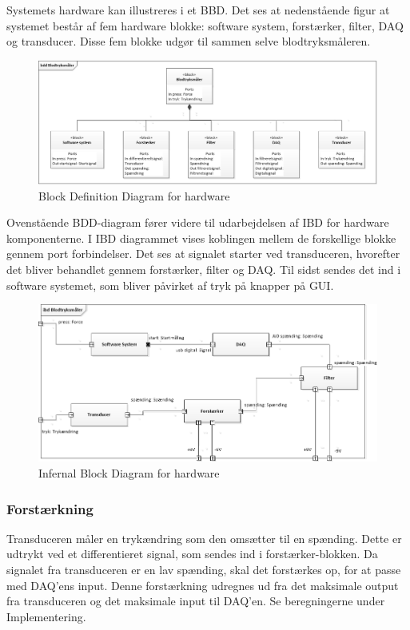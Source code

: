 Systemets hardware kan illustreres i et BBD. Det ses at nedenstående figur at systemet består af fem hardware blokke: software system, forstærker, filter, DAQ og transducer. Disse fem blokke udgør til sammen selve blodtryksmåleren.  
	
\begin{figure}[H]
	\centering
	\includegraphics[width=1.0\textwidth]{Figurer/BDD}
	\caption{Block Definition Diagram for hardware}
\end{figure}

Ovenstående BDD-diagram fører videre til udarbejdelsen af IBD for hardware komponenterne. I IBD diagrammet vises koblingen mellem de forskellige blokke gennem port forbindelser.  Det ses at signalet starter ved transduceren, hvorefter det bliver behandlet gennem forstærker, filter og DAQ. Til sidst sendes det ind i software systemet, som bliver påvirket af tryk på knapper på GUI. 

\begin{figure}[H]
	\centering
	\includegraphics[width=1.0\textwidth]{Figurer/IBD}
	\caption{Infernal Block Diagram for hardware}
	\label{fig:IBD viser koblingen mellem blodtrykssystemets hardwaredele}
\end{figure}

\subsubsection{Forstærkning}
Transduceren måler en trykændring som den omsætter til en spænding. Dette er udtrykt ved et differentieret signal, som sendes ind i forstærker-blokken. Da signalet fra transduceren er en lav spænding, skal det forstærkes op, for at passe med DAQ'ens input. Denne forstærkning udregnes ud fra det maksimale output fra transduceren og det maksimale input til DAQ'en. Se beregningerne under Implementering.  

